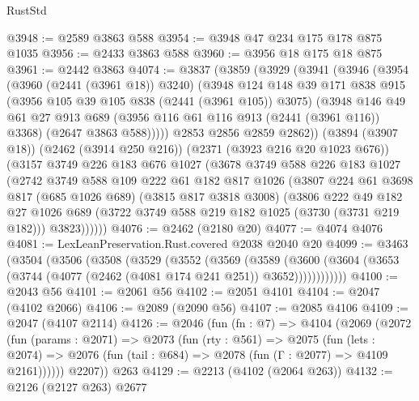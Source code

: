 \begin{lexlean}{RustStd}
\begin{coremodule}
@3948 := @2589 @3863 @588
@3954 := @3948 @47 @234 @175 @178 @875 @1035
@3956 := @2433 @3863 @588
@3960 := @3956 @18 @175 @18 @875
@3961 := @2442 @3863
@4074 := @3837
    (@3859
      (@3929
        (@3941
          (@3946
            (@3954
              (@3960 (@2441 (@3961 @18)) @3240)
              (@3948
                @124
                @148
                @39
                @171
                @838
                @915
                (@3956 @105 @39 @105 @838 (@2441 (@3961 @105)) @3075)
                (@3948
                  @146
                  @49
                  @61
                  @27
                  @913
                  @689
                  (@3956 @116 @61 @116 @913 (@2441 (@3961 @116)) @3368)
                  (@2647 @3863 @588)))))
          @2853
          @2856
          @2859
          @2862))
      (@3894 (@3907 @18))
      (@2462 (@3914 @250 @216))
      (@2371 (@3923 @216 @20 @1023 @676))
      (@3157
        @3749
        @226
        @183
        @676
        @1027
        (@3678
          @3749
          @588
          @226
          @183
          @1027
          (@2742
            @3749
            @588
            @109
            @222
            @61
            @182
            @817
            @1026
            (@3807
              @224
              @61
              @3698
              @817
              (@685 @1026 @689)
              (@3815 @817 @3818 @3008)
              (@3806
                @222
                @49
                @182
                @27
                @1026
                @689
                (@3722 @3749 @588 @219 @182 @1025 (@3730 (@3731 @219 @182)))
                @3823))))))
@4076 := @2462 (@2180 @20)
@4077 := @4074 @4076
@4081 := LexLeanPreservation.Rust.covered @2038 @2040 @20
@4099 := @3463
    (@3504
      (@3506
        (@3508
          (@3529
            (@3552
              (@3569
                (@3589
                  (@3600
                    (@3604 (@3653 (@3744 (@4077 (@2462 (@4081 @174 @241 @251)) @3652))))))))))))
@4100 := @2043 @56
@4101 := @2061 @56
@4102 := @2051 @4101
@4104 := @2047 (@4102 @2066)
@4106 := @2089 (@2090 @56)
@4107 := @2085 @4106
@4109 := @2047 (@4107 @2114)
@4126 := @2046
    (fun (fn : @7) =>
    @4104
      (@2069
        (@2072
          (fun (params : @2071) =>
          @2073
            (fun (rty : @561) =>
            @2075
              (fun (lets : @2074) =>
              @2076 (fun (tail : @684) => @2078 (fun (Γ : @2077) => @4109 @2161))))))
        @2207))
    @263
@4129 := @2213 (@4102 (@2064 @263))
@4132 := @2126 (@2127 @263) @2677

\end{coremodule}
\end{lexlean}
